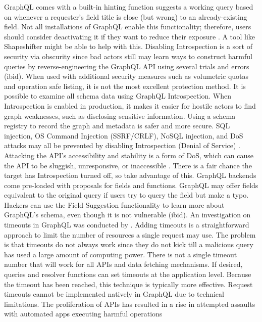 GraphQL comes with a built-in hinting function suggests a working query based on
whenever a requester's field title is close (but wrong) to an already-existing
field. Not all installations of GraphQL enable this functionality; therefore,
users should consider deactivating it if they want to reduce their exposure
\citep{kouraiSecureOffloadingLegacy2016}. A tool like Shapeshifter might be able
to help with this. Disabling Introspection is a sort of security via obscurity
since bad actors still may learn ways to construct harmful queries by
reverse-engineering the GraphQL API using several trials and errors (ibid). When
used with additional security measures such as volumetric quotas and operation
safe listing, it is not the most excellent protection method. It is possible to
examine all schema data using GraphQL Introspection. When Introspection is
enabled in production, it makes it easier for hostile actors to find graph
weaknesses, such as disclosing sensitive information. Using a schema registry to
record the graph and metadata is safer and more secure. SQL injection, OS
Command Injection (SSRF/CRLF), NoSQL injection, and DoS attacks may all be
prevented by disabling Introspection (Denial of Service) \citep{
eizingerAPIDesignDistributed2017}. Attacking the API's accessibility and
stability is a form of DoS, which can cause the API to be sluggish, unresponsive,
or inaccessible \citep{gozneliIdentificationEvaluationProcess2020}. There is a
fair chance the target has Introspection turned off, so take advantage of this.
GraphQL backends come pre-loaded with proposals for fields and functions.
GraphQL may offer fields equivalent to the original query if users try to query
the field but make a typo. Hackers can use the Field Suggestion functionality to
learn more about
GraphQL's schema, even though it is not vulnerable (ibid). An investigation on
timeouts in GraphQL was conducted by \citet{ witternEmpiricalStudyGraphQL2019}.
Adding timeouts is a straightforward approach to limit the number of resources a
single request may use. The problem is that timeouts do not always work since
they do not kick till a malicious query has used a large amount of computing
power. There is not a single timeout number that will work for all APIs and data
fetching mechanisms. If desired, queries and resolver functions can set timeouts
at the application level. Because the timeout has been reached, this technique
is typically more effective. Request timeouts cannot be implemented natively in
GraphQL due to technical limitations. The proliferation of APIs has resulted in
a rise in attempted assaults with automated apps executing harmful operations
